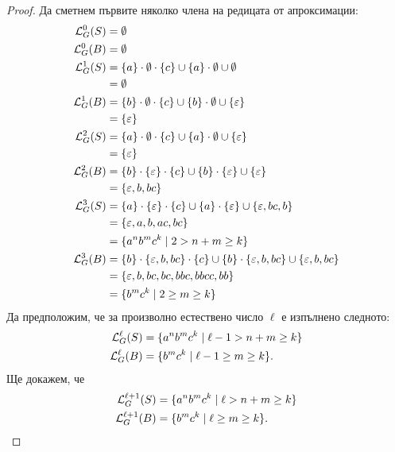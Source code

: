\begin{proof}
  Да сметнем първите няколко члена на редицата от апроксимации:
  \begin{align*}
    \mathcal{L}^0_G(S) & = \emptyset\\
    \mathcal{L}^0_G(B) & = \emptyset\\
    \mathcal{L}^1_G(S) & = \{a\} \cdot \emptyset \cdot \{c\} \cup \{a\}\cdot\emptyset \cup \emptyset \\
              & = \emptyset\\
    \mathcal{L}^1_G(B) & = \{b\} \cdot \emptyset \cdot \{c\} \cup \{b\} \cdot \emptyset \cup \{\varepsilon\} \\
              & = \{\varepsilon\}\\
    \mathcal{L}^2_G(S) & = \{a\} \cdot \emptyset \cdot \{c\} \cup \{a\}\cdot\emptyset \cup \{\varepsilon\} \\
              & = \{\varepsilon\}\\
    \mathcal{L}^2_G(B) & = \{b\} \cdot \{\varepsilon\} \cdot \{c\} \cup \{b\}\cdot \{\varepsilon\} \cup \{\varepsilon\} \\
              & = \{\varepsilon,b,bc\}\\
    \mathcal{L}^3_G(S) & = \{a\} \cdot \{\varepsilon\} \cdot \{c\} \cup \{a\}\cdot\{\varepsilon\} \cup \{\varepsilon,bc,b\} \\
              & = \{\varepsilon, a, b, ac, bc\}\\
              & = \{a^nb^mc^k \mid 2 > n+m \geq k\}\\
    \mathcal{L}^3_G(B) & = \{b\} \cdot \{\varepsilon,b,bc\} \cdot \{c\} \cup \{b\}\cdot \{\varepsilon,b,bc\} \cup \{\varepsilon,b,bc\} \\
              & = \{\varepsilon,b,bc,bc,bbc,bbcc,bb\}\\
              & = \{ b^mc^k \mid 2 \geq m \geq k\}
  \end{align*}
  Да предположим, че за произволно естествено число $\ell$ е изпълнено следното:
  \begin{align*}
    \mathcal{L}^\ell_G(S) & = \{a^nb^mc^k \mid \ell - 1 > n+m \geq k\}\\
    \mathcal{L}^\ell_G(B)  & = \{ b^mc^k \mid \ell -1 \geq m \geq k\}.
  \end{align*}
  Ще докажем, че
  \begin{align*}
    \mathcal{L}^{\ell+1}_G(S) & = \{a^nb^mc^k \mid \ell > n+m \geq k\}\\
    \mathcal{L}^{\ell+1}_G(B)  & = \{ b^mc^k \mid \ell \geq m \geq k\}.
  \end{align*}


\end{proof}
